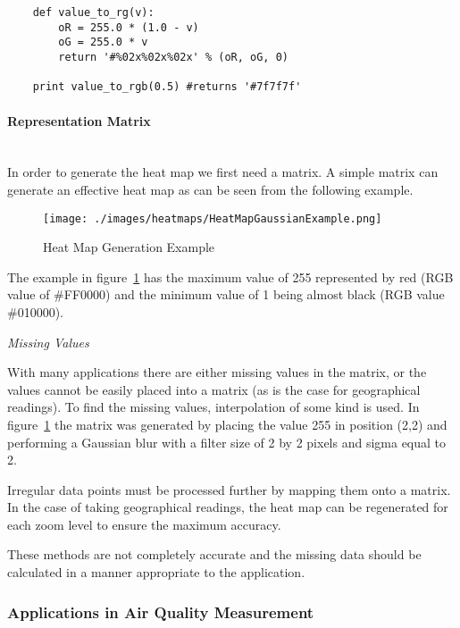\begin{verbatim}	
	def value_to_rg(v):
	    oR = 255.0 * (1.0 - v)
	    oG = 255.0 * v
	    return '#%02x%02x%02x' % (oR, oG, 0)
	    
	print value_to_rgb(0.5) #returns '#7f7f7f'
\end{verbatim}


\paragraph{Representation Matrix} \hspace{0pt} \\

In order to generate the heat map we first need a matrix. A simple matrix can generate an effective heat map as can be seen from the following example.

\begin{figure}[H]
        \begin{center}
                \texttt{[image: ./images/heatmaps/HeatMapGaussianExample.png]}
                \caption{Heat Map Generation Example}
                \label{fig:matrixheatmapexample}
        \end{center}
\end{figure}

The example in figure~\ref{fig:matrixheatmapexample} has the maximum value of 255 represented by red (RGB value of \#FF0000) and the minimum value of 1 being almost black (RGB value \#010000). 

\emph{Missing Values}

With many applications there are either missing values in the matrix, or the values cannot be easily placed into a matrix (as is the case for geographical readings). To find the missing values, interpolation of some kind is used. In figure~\ref{fig:matrixheatmapexample} the matrix was generated by placing the value 255 in position (2,2) and performing a Gaussian blur with a filter size of 2 by 2 pixels and sigma equal to 2. 

Irregular data points must be processed further by mapping them onto a matrix. In the case of taking geographical readings, the heat map can be regenerated for each zoom level to ensure the maximum accuracy. 

These methods are not completely accurate and the missing data should be calculated in a manner appropriate to the application.

\subsubsection{Applications in Air Quality Measurement}\label{applicationsinaqmeasurement}

